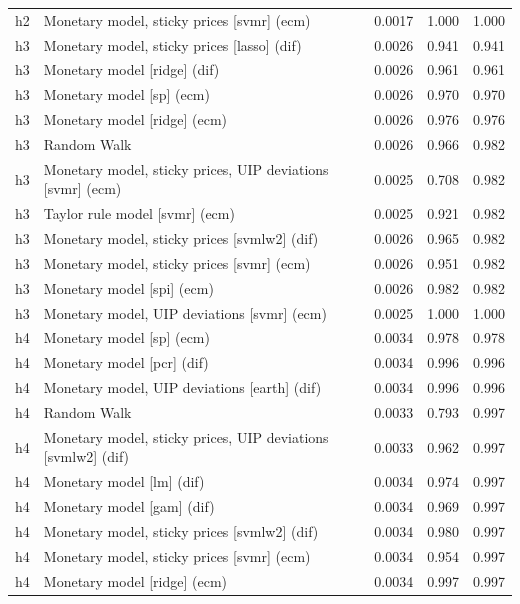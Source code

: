 \begin{ThreePartTable}
\begin{longtable}[t]{cp{5.5cm}ccc}
h2 & \raggedright Monetary model, sticky prices [svmr] (ecm) & 0.0017 & 1.000 & 1.000\\
\addlinespace
h3 & \raggedright Monetary model, sticky prices [lasso] (dif) & 0.0026 & 0.941 & 0.941\\
h3 & \raggedright Monetary model [ridge] (dif) & 0.0026 & 0.961 & 0.961\\
h3 & \raggedright Monetary model [sp] (ecm) & 0.0026 & 0.970 & 0.970\\
h3 & \raggedright Monetary model [ridge] (ecm) & 0.0026 & 0.976 & 0.976\\
h3 & \raggedright Random Walk & 0.0026 & 0.966 & 0.982\\
h3 & \raggedright Monetary model, sticky prices, UIP deviations [svmr] (ecm) & 0.0025 & 0.708 & 0.982\\
h3 & \raggedright Taylor rule model [svmr] (ecm) & 0.0025 & 0.921 & 0.982\\
h3 & \raggedright Monetary model, sticky prices [svmlw2] (dif) & 0.0026 & 0.965 & 0.982\\
h3 & \raggedright Monetary model, sticky prices [svmr] (ecm) & 0.0026 & 0.951 & 0.982\\
h3 & \raggedright Monetary model [spi] (ecm) & 0.0026 & 0.982 & 0.982\\
h3 & \raggedright Monetary model, UIP deviations [svmr] (ecm) & 0.0025 & 1.000 & 1.000\\
\addlinespace
h4 & \raggedright Monetary model [sp] (ecm) & 0.0034 & 0.978 & 0.978\\
h4 & \raggedright Monetary model [pcr] (dif) & 0.0034 & 0.996 & 0.996\\
h4 & \raggedright Monetary model, UIP deviations [earth] (dif) & 0.0034 & 0.996 & 0.996\\
h4 & \raggedright Random Walk & 0.0033 & 0.793 & 0.997\\
h4 & \raggedright Monetary model, sticky prices, UIP deviations [svmlw2] (dif) & 0.0033 & 0.962 & 0.997\\
h4 & \raggedright Monetary model [lm] (dif) & 0.0034 & 0.974 & 0.997\\
h4 & \raggedright Monetary model [gam] (dif) & 0.0034 & 0.969 & 0.997\\
h4 & \raggedright Monetary model, sticky prices [svmlw2] (dif) & 0.0034 & 0.980 & 0.997\\
h4 & \raggedright Monetary model, sticky prices [svmr] (ecm) & 0.0034 & 0.954 & 0.997\\
h4 & \raggedright Monetary model [ridge] (ecm) & 0.0034 & 0.997 & 0.997\\

\end{longtable}
\end{ThreePartTable}
